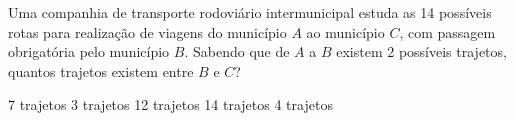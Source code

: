Uma companhia de transporte rodoviário intermunicipal estuda as 14 possíveis rotas para realização de viagens do município $A$ ao município $C$, com passagem obrigatória pelo município $B$. Sabendo que de $A$ a $B$ existem 2 possíveis trajetos, quantos trajetos existem entre $B$ e $C$?

7 trajetos
3 trajetos
12 trajetos
14 trajetos
4 trajetos



